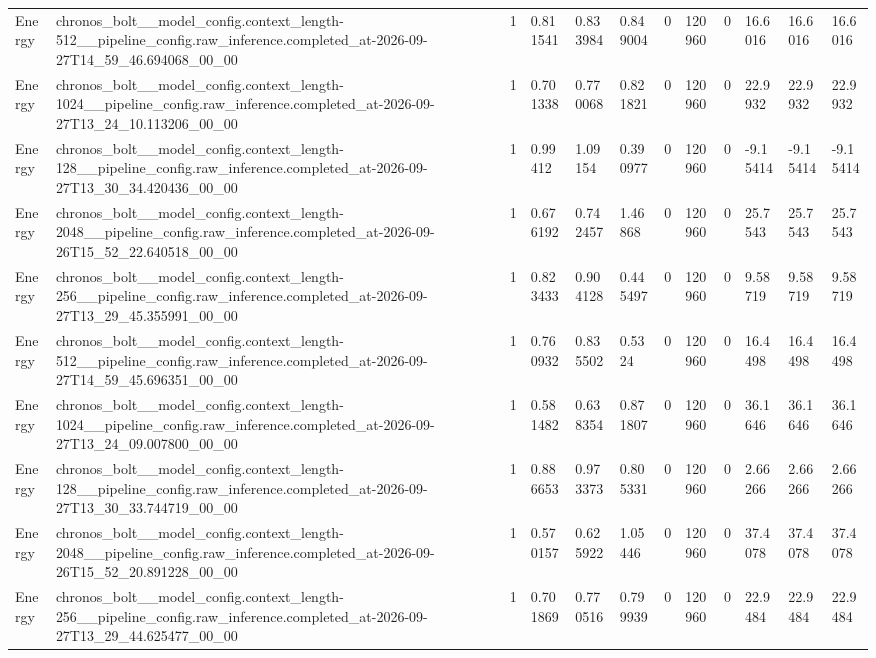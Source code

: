 \begin{tabular}{llllllllllll}
Energy & chronos\_bolt\_\_model\_config.context\_length-512\_\_pipeline\_config.raw\_inference.completed\_at-2026-09-27T14\_59\_46.694068\_00\_00 & 1 & 0.811541 & 0.833984 & 0.849004 & 0 & 120960 & 0 & 16.6016 & 16.6016 & 16.6016 \\
Energy & chronos\_bolt\_\_model\_config.context\_length-1024\_\_pipeline\_config.raw\_inference.completed\_at-2026-09-27T13\_24\_10.113206\_00\_00 & 1 & 0.701338 & 0.770068 & 0.821821 & 0 & 120960 & 0 & 22.9932 & 22.9932 & 22.9932 \\
Energy & chronos\_bolt\_\_model\_config.context\_length-128\_\_pipeline\_config.raw\_inference.completed\_at-2026-09-27T13\_30\_34.420436\_00\_00 & 1 & 0.99412 & 1.09154 & 0.390977 & 0 & 120960 & 0 & -9.15414 & -9.15414 & -9.15414 \\
Energy & chronos\_bolt\_\_model\_config.context\_length-2048\_\_pipeline\_config.raw\_inference.completed\_at-2026-09-26T15\_52\_22.640518\_00\_00 & 1 & 0.676192 & 0.742457 & 1.46868 & 0 & 120960 & 0 & 25.7543 & 25.7543 & 25.7543 \\
Energy & chronos\_bolt\_\_model\_config.context\_length-256\_\_pipeline\_config.raw\_inference.completed\_at-2026-09-27T13\_29\_45.355991\_00\_00 & 1 & 0.823433 & 0.904128 & 0.445497 & 0 & 120960 & 0 & 9.58719 & 9.58719 & 9.58719 \\
Energy & chronos\_bolt\_\_model\_config.context\_length-512\_\_pipeline\_config.raw\_inference.completed\_at-2026-09-27T14\_59\_45.696351\_00\_00 & 1 & 0.760932 & 0.835502 & 0.5324 & 0 & 120960 & 0 & 16.4498 & 16.4498 & 16.4498 \\
Energy & chronos\_bolt\_\_model\_config.context\_length-1024\_\_pipeline\_config.raw\_inference.completed\_at-2026-09-27T13\_24\_09.007800\_00\_00 & 1 & 0.581482 & 0.638354 & 0.871807 & 0 & 120960 & 0 & 36.1646 & 36.1646 & 36.1646 \\
Energy & chronos\_bolt\_\_model\_config.context\_length-128\_\_pipeline\_config.raw\_inference.completed\_at-2026-09-27T13\_30\_33.744719\_00\_00 & 1 & 0.886653 & 0.973373 & 0.805331 & 0 & 120960 & 0 & 2.66266 & 2.66266 & 2.66266 \\
Energy & chronos\_bolt\_\_model\_config.context\_length-2048\_\_pipeline\_config.raw\_inference.completed\_at-2026-09-26T15\_52\_20.891228\_00\_00 & 1 & 0.570157 & 0.625922 & 1.05446 & 0 & 120960 & 0 & 37.4078 & 37.4078 & 37.4078 \\
Energy & chronos\_bolt\_\_model\_config.context\_length-256\_\_pipeline\_config.raw\_inference.completed\_at-2026-09-27T13\_29\_44.625477\_00\_00 & 1 & 0.701869 & 0.770516 & 0.799939 & 0 & 120960 & 0 & 22.9484 & 22.9484 & 22.9484 \\

\end{tabular}
